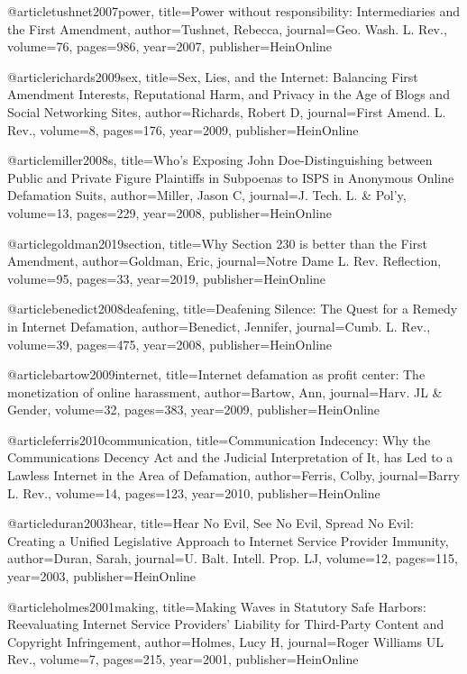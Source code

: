 @article{tushnet2007power,
  title={Power without responsibility: Intermediaries and the First Amendment},
  author={Tushnet, Rebecca},
  journal={Geo. Wash. L. Rev.},
  volume={76},
  pages={986},
  year={2007},
  publisher={HeinOnline}
}

@article{richards2009sex,
  title={Sex, Lies, and the Internet: Balancing First Amendment Interests, Reputational Harm, and Privacy in the Age of Blogs and Social Networking Sites},
  author={Richards, Robert D},
  journal={First Amend. L. Rev.},
  volume={8},
  pages={176},
  year={2009},
  publisher={HeinOnline}
}

@article{miller2008s,
  title={Who's Exposing John Doe-Distinguishing between Public and Private Figure Plaintiffs in Subpoenas to ISPS in Anonymous Online Defamation Suits},
  author={Miller, Jason C},
  journal={J. Tech. L. \& Pol'y},
  volume={13},
  pages={229},
  year={2008},
  publisher={HeinOnline}
}


@article{goldman2019section,
  title={Why Section 230 is better than the First Amendment},
  author={Goldman, Eric},
  journal={Notre Dame L. Rev. Reflection},
  volume={95},
  pages={33},
  year={2019},
  publisher={HeinOnline}
}


@article{benedict2008deafening,
  title={Deafening Silence: The Quest for a Remedy in Internet Defamation},
  author={Benedict, Jennifer},
  journal={Cumb. L. Rev.},
  volume={39},
  pages={475},
  year={2008},
  publisher={HeinOnline}
}

@article{bartow2009internet,
  title={Internet defamation as profit center: The monetization of online harassment},
  author={Bartow, Ann},
  journal={Harv. JL \& Gender},
  volume={32},
  pages={383},
  year={2009},
  publisher={HeinOnline}
}

@article{ferris2010communication,
  title={Communication Indecency: Why the Communications Decency Act and the Judicial Interpretation of It, has Led to a Lawless Internet in the Area of Defamation},
  author={Ferris, Colby},
  journal={Barry L. Rev.},
  volume={14},
  pages={123},
  year={2010},
  publisher={HeinOnline}
}

@article{duran2003hear,
  title={Hear No Evil, See No Evil, Spread No Evil: Creating a Unified Legislative Approach to Internet Service Provider Immunity},
  author={Duran, Sarah},
  journal={U. Balt. Intell. Prop. LJ},
  volume={12},
  pages={115},
  year={2003},
  publisher={HeinOnline}
}

@article{holmes2001making,
  title={Making Waves in Statutory Safe Harbors: Reevaluating Internet Service Providers' Liability for Third-Party Content and Copyright Infringement},
  author={Holmes, Lucy H},
  journal={Roger Williams UL Rev.},
  volume={7},
  pages={215},
  year={2001},
  publisher={HeinOnline}
}


